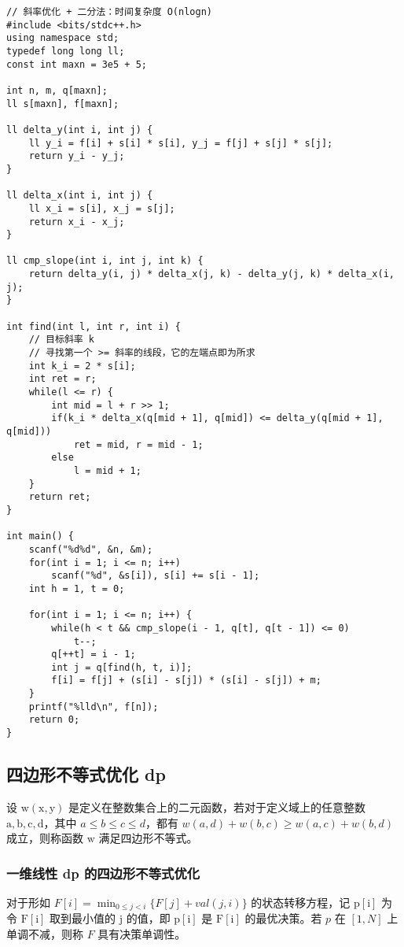 \documentclass[UTF8]{article}
\begin{document}
\begin{lstlisting}[caption=斜率优化 dp + 二分法]
// 斜率优化 + 二分法：时间复杂度 O(nlogn)
#include <bits/stdc++.h>
using namespace std;
typedef long long ll;
const int maxn = 3e5 + 5;

int n, m, q[maxn];
ll s[maxn], f[maxn];

ll delta_y(int i, int j) {
    ll y_i = f[i] + s[i] * s[i], y_j = f[j] + s[j] * s[j];
    return y_i - y_j;
}

ll delta_x(int i, int j) {
    ll x_i = s[i], x_j = s[j];
    return x_i - x_j;
}

ll cmp_slope(int i, int j, int k) {
    return delta_y(i, j) * delta_x(j, k) - delta_y(j, k) * delta_x(i, j);
}

int find(int l, int r, int i) {
    // 目标斜率 k
    // 寻找第一个 >= 斜率的线段，它的左端点即为所求
    int k_i = 2 * s[i];
    int ret = r;
    while(l <= r) {
        int mid = l + r >> 1;
        if(k_i * delta_x(q[mid + 1], q[mid]) <= delta_y(q[mid + 1], q[mid]))
            ret = mid, r = mid - 1;
        else
            l = mid + 1;
    }
    return ret;
}

int main() {
    scanf("%d%d", &n, &m);
    for(int i = 1; i <= n; i++)
        scanf("%d", &s[i]), s[i] += s[i - 1];
    int h = 1, t = 0;

    for(int i = 1; i <= n; i++) {
        while(h < t && cmp_slope(i - 1, q[t], q[t - 1]) <= 0)
            t--;
        q[++t] = i - 1;
        int j = q[find(h, t, i)];
        f[i] = f[j] + (s[i] - s[j]) * (s[i] - s[j]) + m;
    }
    printf("%lld\n", f[n]);
    return 0;
}
\end{lstlisting}



\subsection{四边形不等式优化 dp}
设 $\mathrm{w(x, y)}$ 是定义在整数集合上的二元函数，若对于定义域上的任意整数 $\mathrm{a, b, c, d}$，其中 $a \le b \le c \le d$，都有 $w(a, d) + w(b, c) \ge w(a, c) + w(b, d)$ 成立，则称函数 $\mathrm{w}$ 满足四边形不等式。

\subsubsection{一维线性 dp 的四边形不等式优化}
对于形如 $F[i] = \min_{0 \le j < i} \{ F[j] + val(j, i) \}$ 的状态转移方程，记 $\mathrm{p[i]}$ 为令 $\mathrm{F[i]}$ 取到最小值的 $\mathrm{j}$ 的值，即 $\mathrm{p[i]}$ 是 $\mathrm{F[i]}$ 的最优决策。若 $p$ 在 $[1, N]$ 上单调不减，则称 $F$ 具有决策单调性。
\end{document}
